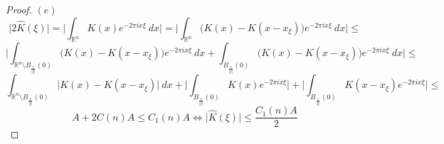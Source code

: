 \documentclass[12pt]{article}
\newenvironment{exercise}[2][Exercise]{\begin{trivlist}
\item[\hskip \labelsep {\bfseries #1}\hskip \labelsep {\bfseries #2.}]}{\end{trivlist}}
\begin{document}
\begin{proof}
  $(e)$
  $$\Big| 2\hat{K}(\xi) \Big| = \Big| \int_{\mathbb{R}^n} K(x) e^{-2 \pi i x \xi}\ dx \Big| = \Big|\int_{\mathbb{R}^n} \Big( K(x) - K(x - x_{\xi}) \Big) e^{-2 \pi i x \xi}\ dx \Big| \le$$
  $$\Big|\int_{\mathbb{R}^n \setminus B_\frac{1}{|\xi|}(0)} \Big( K(x) - K(x - x_{\xi}) \Big) e^{-2 \pi i x \xi}\ dx + \int_{B_\frac{1}{|\xi|}(0)} \Big( K(x) - K(x - x_{\xi}) \Big) e^{-2 \pi i x \xi}\ dx\Big| \le$$
  $$\int_{\mathbb{R}^n \setminus B_\frac{1}{|\xi|}(0)} \Big| K(x) - K(x - x_{\xi}) \Big|\ dx + \Big|\int_{B_\frac{1}{|\xi|}(0)} K(x)e^{-2 \pi i x \xi}\Big| + \Big| \int_{B_\frac{1}{|\xi|}(0)} K(x-x_\xi)e^{-2 \pi i x \xi} \Big| \le$$
  $$A + 2C(n)A \le C_1(n)A \iff \Big| \hat{K}(\xi) \Big| \le \frac{C_1(n)A}{2}$$
\end{proof}

\begin{exercise}{3}
\end{exercise}
\end{document}

